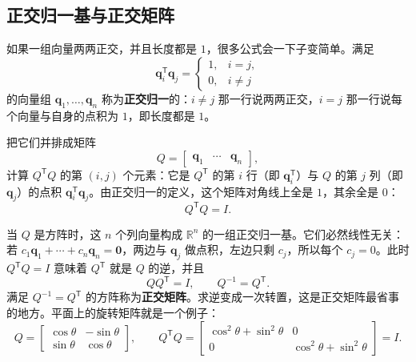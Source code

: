 \documentclass[UTF8,a4paper,12pt]{ctexart}
\numberwithin{equation}{section}
\newcommand{\R}{\mathbb{R}}
\newcommand{\trans}{^{\mathsf T}}
\begin{document}
	\subsection{正交归一基与正交矩阵}

	如果一组向量两两正交，并且长度都是 $1$，很多公式会一下子变简单。满足
	\begin{equation}\label{eq:6.73}
	\bm{q}_i\trans\bm{q}_j
	=
	\begin{cases}
		1,&i=j,\\
		0,&i\neq j
	\end{cases}
	\end{equation}
	的向量组 $\bm{q}_1,\ldots,\bm{q}_n$ 称为\textbf{正交归一}的：$i\neq j$ 那一行说两两正交，$i=j$ 那一行说每个向量与自身的点积为 $1$，即长度都是 $1$。

	把它们并排成矩阵
	\begin{equation}\label{eq:6.74}
	Q=
	\begin{bmatrix}
		\bm{q}_1&\cdots&\bm{q}_n
	\end{bmatrix},
	\end{equation}
	计算 $Q\trans Q$ 的第 $(i,j)$ 个元素：它是 $Q\trans$ 的第 $i$ 行（即 $\bm{q}_i\trans$）与 $Q$ 的第 $j$ 列（即 $\bm{q}_j$）的点积 $\bm{q}_i\trans\bm{q}_j$。由正交归一的定义，这个矩阵对角线上全是 $1$，其余全是 $0$：
	\begin{equation}\label{eq:6.75}
	\boxed{Q\trans Q=I.}
	\end{equation}

	当 $Q$ 是方阵时，这 $n$ 个列向量构成 $\R^n$ 的一组正交归一基。它们必然线性无关：若 $c_1\bm{q}_1+\cdots+c_n\bm{q}_n=\bm{0}$，两边与 $\bm{q}_j$ 做点积，左边只剩 $c_j$，所以每个 $c_j=0$。此时 $Q\trans Q=I$ 意味着 $Q\trans$ 就是 $Q$ 的逆，并且
	\begin{equation}\label{eq:6.76}
	QQ\trans=I,
	\qquad
	\boxed{Q^{-1}=Q\trans.}
	\end{equation}
	满足 $Q^{-1}=Q\trans$ 的方阵称为\textbf{正交矩阵}。求逆变成一次转置，这是正交矩阵最省事的地方。平面上的旋转矩阵就是一个例子：
	\begin{equation}\label{eq:6.77}
	Q=
	\begin{bmatrix}
		\cos\theta&-\sin\theta\\
		\sin\theta&\cos\theta
	\end{bmatrix},
	\qquad
	Q\trans Q=
	\begin{bmatrix}
		\cos^2\theta+\sin^2\theta&0\\
		0&\cos^2\theta+\sin^2\theta
	\end{bmatrix}
	=I.
	\end{equation}
\end{document}
